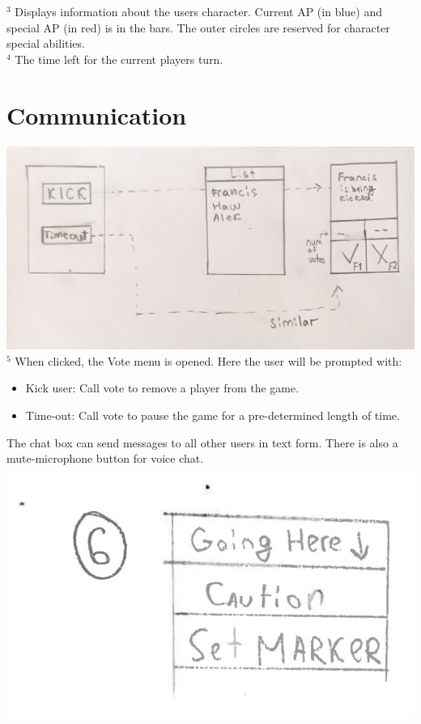 \documentclass[12pt]{article}
\theoremstyle{definition}
\begin{document}
$^3$ Displays information about the users character. Current AP (in blue) and special AP (in red) is in the bars. The outer circles are reserved for character special abilities.
\\ \linebreak
$^4$ The time left for the current players turn.
\\ \linebreak

\section*{Communication}
\includegraphics[scale=0.3]{Vote}\\
$^5$ When clicked, the Vote menu is opened. Here the user will be prompted with:
\begin{itemize}
	\item Kick user: Call vote to remove a player from the game.
	\item Time-out: Call vote to pause the game for a pre-determined length of time.
\end{itemize}
The chat box can send messages to all other users in text form. There is also a mute-microphone button for voice chat.
\\ \linebreak
\includegraphics[scale=0.5]{PingMenu}\\
\end{document}
